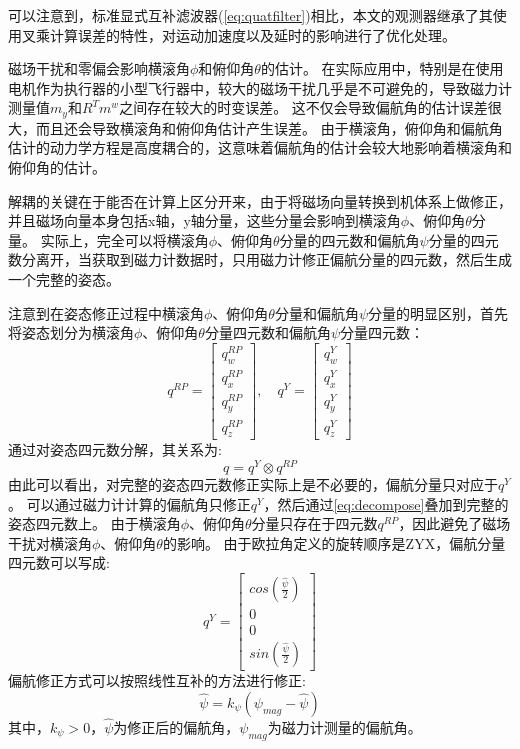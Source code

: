 \documentclass[
  type=master
]{gdutthesis}
\begin{document}
可以注意到，标准显式互补滤波器(\autoref{eq:quatfilter})相比，本文的观测器继承了其使用叉乘计算误差的特性，对运动加速度以及延时的影响进行了优化处理。

磁场干扰和零偏会影响横滚角$\phi$和俯仰角$\theta$的估计。
在实际应用中，特别是在使用电机作为执行器的小型飞行器中，较大的磁场干扰几乎是不可避免的，导致磁力计测量值$m_y$和$R^T m^w$之间存在较大的时变误差。
这不仅会导致偏航角的估计误差很大，而且还会导致横滚角和俯仰角估计产生误差。
由于横滚角，俯仰角和偏航角估计的动力学方程是高度耦合的，这意味着偏航角的估计会较大地影响着横滚角和俯仰角的估计。

解耦的关键在于能否在计算上区分开来，由于将磁场向量转换到机体系上做修正，并且磁场向量本身包括x轴，y轴分量，这些分量会影响到横滚角$\phi$、俯仰角$\theta$分量。
实际上，完全可以将横滚角$\phi$、俯仰角$\theta$分量的四元数和偏航角$\psi$分量的四元数分离开，当获取到磁力计数据时，只用磁力计修正偏航分量的四元数，然后生成一个完整的姿态。

注意到在姿态修正过程中横滚角$\phi$、俯仰角$\theta$分量和偏航角$\psi$分量的明显区别，首先将姿态划分为横滚角$\phi$、俯仰角$\theta$分量四元数和偏航角$\psi$分量四元数：\vspace{1ex}
\[
q^{RP} = 
\begin{bmatrix}
	q_w^{RP} \\
	q_x^{RP} \\
	q_y^{RP} \\
	q_z^{RP}
\end{bmatrix},
\hspace{1em}
q^{Y} = 
\begin{bmatrix}
	q_w^{Y} \\
	q_x^{Y} \\
	q_y^{Y} \\
	q_z^{Y}
\end{bmatrix}
\]
通过对姿态四元数分解，其关系为:
\begin{equation}\label{eq:decompose}
	q = q^{Y} \otimes q^{RP}	
\end{equation}
由此可以看出，对完整的姿态四元数修正实际上是不必要的，偏航分量只对应于$q^{Y}$。
可以通过磁力计计算的偏航角只修正$q^{Y}$，然后通过\autoref{eq:decompose}叠加到完整的姿态四元数上。
由于横滚角$\phi$、俯仰角$\theta$分量只存在于四元数$q^{RP}$，因此避免了磁场干扰对横滚角$\phi$、俯仰角$\theta$的影响。
由于欧拉角定义的旋转顺序是ZYX，偏航分量四元数可以写成:
\begin{equation}
	q^{Y} = 
	\begin{bmatrix}
		cos(\frac{\hat{\psi}}{2}) \\
		0 \\
		0 \\
		sin(\frac{\hat{\psi}}{2})
	\end{bmatrix}	
\end{equation}
偏航修正方式可以按照线性互补的方法进行修正:
\begin{equation}
	\hat{\psi} = k_{\psi} (\psi_{mag} - \hat{\psi}) 	
\end{equation}
其中，$k_{\psi} > 0$，$\hat{\psi}$为修正后的偏航角，$\psi_{mag}$为磁力计测量的偏航角。
\end{document}
